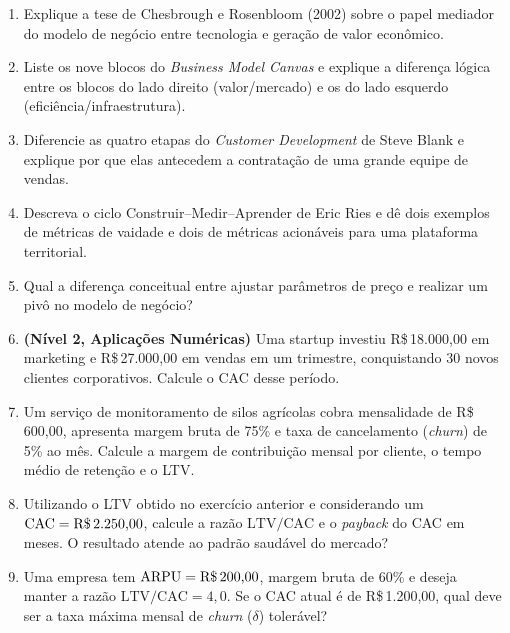\begin{enumerate}[leftmargin=1.5em, itemsep=6pt]
  \item Explique a tese de Chesbrough e Rosenbloom (2002) sobre o papel mediador do modelo de negócio entre tecnologia e geração de valor econômico.
  \espacoResolucao[1.8cm]

  \item Liste os nove blocos do \textit{Business Model Canvas} e explique a diferença lógica entre os blocos do lado direito (valor/mercado) e os do lado esquerdo (eficiência/infraestrutura).
  \espacoResolucao[1.8cm]

  \item Diferencie as quatro etapas do \textit{Customer Development} de Steve Blank e explique por que elas antecedem a contratação de uma grande equipe de vendas.
  \espacoResolucao[1.8cm]

  \item Descreva o ciclo Construir–Medir–Aprender de Eric Ries e dê dois exemplos de métricas de vaidade e dois de métricas acionáveis para uma plataforma territorial.
  \espacoResolucao[1.8cm]

  \item Qual a diferença conceitual entre ajustar parâmetros de preço e realizar um pivô no modelo de negócio?
  \espacoResolucao[1.8cm]

  \item \textbf{(Nível 2, Aplicações Numéricas)} Uma startup investiu R\$\,18.000,00 em marketing e R\$\,27.000,00 em vendas em um trimestre, conquistando 30 novos clientes corporativos. Calcule o CAC desse período.
  \espacoResolucao[2.1cm]

  \item Um serviço de monitoramento de silos agrícolas cobra mensalidade de R\$\,600,00, apresenta margem bruta de 75\% e taxa de cancelamento (\textit{churn}) de 5\% ao mês. Calcule a margem de contribuição mensal por cliente, o tempo médio de retenção e o LTV.
  \espacoResolucao[2.2cm]

  \item Utilizando o LTV obtido no exercício anterior e considerando um $\text{CAC} = \text{R\$\,2.250,00}$, calcule a razão $\text{LTV/CAC}$ e o \textit{payback} do CAC em meses. O resultado atende ao padrão saudável do mercado?
  \espacoResolucao[2.2cm]

  \item Uma empresa tem $\text{ARPU} = \text{R\$\,200,00}$, margem bruta de 60\% e deseja manter a razão $\text{LTV/CAC} = 4{,}0$. Se o CAC atual é de R\$\,1.200,00, qual deve ser a taxa máxima mensal de \textit{churn} ($\delta$) tolerável?
  \espacoResolucao[2.3cm]


\end{enumerate}
